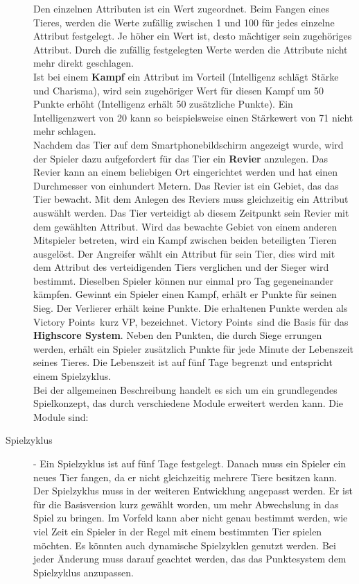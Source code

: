 \begin{description}
Den einzelnen Attributen ist ein Wert zugeordnet. Beim Fangen eines Tieres, werden die Werte zufällig zwischen 1 und 100 für jedes einzelne Attribut festgelegt. Je höher ein Wert ist, desto mächtiger sein zugehöriges Attribut. Durch die zufällig festgelegten Werte werden die Attribute nicht mehr direkt geschlagen. \\
Ist bei einem \textbf{Kampf} ein Attribut im Vorteil (Intelligenz schlägt Stärke und Charisma), wird sein zugehöriger Wert für diesen Kampf um 50 Punkte erhöht (Intelligenz erhält 50 zusätzliche Punkte). Ein Intelligenzwert von 20 kann so beispielsweise einen Stärkewert von 71 nicht mehr schlagen. \\
Nachdem das Tier auf dem Smartphonebildschirm angezeigt wurde, wird der Spieler dazu aufgefordert für das Tier ein \textbf{Revier} anzulegen.  Das Revier kann an einem beliebigen Ort eingerichtet werden und hat einen Durchmesser von einhundert Metern. Das Revier ist ein Gebiet, das das Tier bewacht. Mit dem Anlegen des Reviers muss gleichzeitig ein Attribut auswählt werden. Das Tier verteidigt ab diesem Zeitpunkt sein Revier mit dem gewählten Attribut. Wird das bewachte Gebiet von einem anderen Mitspieler betreten, wird ein Kampf zwischen beiden beteiligten Tieren ausgelöst. Der Angreifer wählt ein Attribut für sein Tier, dies wird mit dem Attribut des verteidigenden Tiers verglichen und der Sieger wird bestimmt. Dieselben Spieler können nur einmal pro Tag gegeneinander kämpfen. Gewinnt ein Spieler einen Kampf, erhält er Punkte für seinen Sieg. Der Verlierer erhält keine Punkte. Die erhaltenen Punkte werden als \glqq Victory Points\grqq\, kurz VP, bezeichnet. \glqq Victory Points\grqq\ sind die Basis für das \textbf{Highscore System}. Neben den Punkten, die durch Siege errungen werden, erhält ein Spieler zusätzlich Punkte für jede Minute der Lebenszeit seines Tieres. Die Lebenszeit ist auf fünf Tage begrenzt und entspricht einem Spielzyklus. \\


Bei der allgemeinen Beschreibung handelt es sich um ein grundlegendes Spielkonzept, das durch verschiedene Module erweitert werden kann. Die Module sind: \\

\item[Spielzyklus] - 
Ein Spielzyklus ist auf fünf Tage festgelegt. Danach muss ein Spieler ein neues Tier fangen, da er nicht gleichzeitig mehrere Tiere besitzen kann. Der Spielzyklus muss in der weiteren Entwicklung angepasst werden. Er ist für die Basisversion kurz gewählt worden, um mehr Abwechslung in das Spiel zu bringen. Im Vorfeld kann aber nicht genau bestimmt werden, wie viel Zeit ein Spieler in der Regel mit einem bestimmten Tier spielen möchten. Es könnten auch dynamische Spielzyklen genutzt werden. Bei jeder Änderung muss darauf geachtet werden, das das Punktesystem dem Spielzyklus anzupassen.


\end{description}
